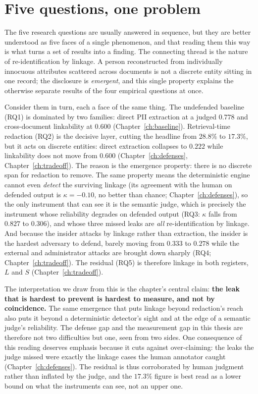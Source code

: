 \section{Five questions, one problem}
\label{sec:disc-throughline}

The five research questions are usually answered in sequence, but they are better
understood as five faces of a single phenomenon, and that reading them this way is what turns a
set of results into a finding. The connecting thread is the nature of re-identification by
linkage. A person reconstructed from individually innocuous attributes scattered across
documents is not a discrete entity sitting in one record; the disclosure is \emph{emergent}, and
this single property explains the otherwise separate results of the four empirical
questions at once.

Consider them in turn, each a face of the same thing. The undefended baseline (RQ1) is
dominated by two families: direct PII extraction at a judged $0.778$ and cross-document
linkability at $0.600$ (Chapter~\ref{ch:baseline}). Retrieval-time redaction (RQ2) is the
decisive layer, cutting the headline from $28.8\%$ to $17.3\%$, but it acts on discrete
entities: direct extraction collapses to $0.222$ while linkability does not move from $0.600$
(Chapter~\ref{ch:defenses}, Chapter~\ref{ch:tradeoff}). The reason is the emergence property:
there is no discrete span for redaction to remove. The same property means the deterministic
engine cannot even \emph{detect} the surviving linkage (its agreement with the human on defended
output is $\kappa = -0.10$, no better than chance; Chapter~\ref{ch:defenses}), so the only
instrument that can see it is the semantic judge, which is precisely the instrument whose
reliability degrades on defended output (RQ3: $\kappa$ falls from $0.827$ to $0.306$), and whose
three missed leaks are \emph{all} re-identification by linkage. And because the insider attacks
by linkage rather than extraction, the insider is the hardest adversary to defend, barely moving
from $0.333$ to $0.278$ while the external and administrator attacks are brought down sharply
(RQ4; Chapter~\ref{ch:tradeoff}). The residual (RQ5) is therefore linkage in both registers, $L$
and $S$ (Chapter~\ref{ch:tradeoff}).

The interpretation we draw from this is the chapter's central claim: \textbf{the leak that is
hardest to prevent is hardest to measure, and not by coincidence.} The same emergence that puts
linkage beyond redaction's reach also puts it beyond a deterministic detector's sight and at the
edge of a semantic judge's reliability. The defense gap and the
measurement gap in this thesis are therefore not two difficulties but one, seen from two sides. One
consequence of this reading deserves emphasis because it cuts against over-claiming: the leaks
the judge missed were exactly the linkage cases the human annotator caught
(Chapter~\ref{ch:defenses}). The residual is thus corroborated by human judgment rather than
inflated by the judge, and the $17.3\%$ figure is best read as a lower bound on what the
instruments can see, not an upper one.

